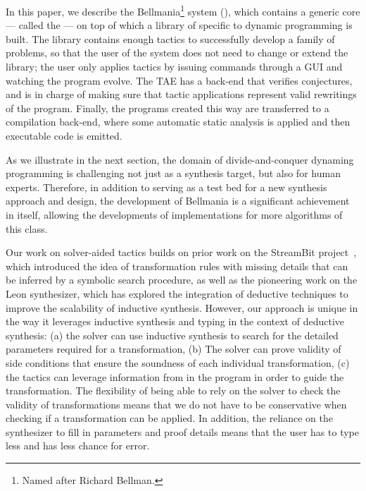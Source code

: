 In this paper, we describe the Bellmania\footnote{Named after Richard Bellman.} system (), which contains a generic
core --- called the  ---
on top of which a library of  specific to dynamic programming
is built. The library contains enough tactics to successfully develop a
family of problems, so that the user of the system does not need to change
or extend the library; the user only applies tactics by issuing commands
through a GUI and watching the program evolve. The TAE has a back-end that
verifies conjectures, and is in charge of making sure that
tactic applications represent valid rewritings of the program. Finally, the
programs created this way are transferred to a compilation back-end, where
some automatic static analysis is applied and then executable code is
emitted.

As we illustrate in the next section, the domain of divide-and-conquer dynaming programming is challenging not just as a synthesis target, but also for human experts. Therefore, in addition to serving as a test bed for a new synthesis approach and design, the development of Bellmania is a significant achievement in itself,
allowing the developments of implementations for more algorithms of this class.

Our work on solver-aided tactics builds on prior work on the StreamBit project~\cite{PLDI05/Solar-Lezama}, which
introduced the idea of transformation rules with missing details that can be inferred by a symbolic search procedure, as
well as the pioneering work on the Leon synthesizer, which has explored the integration of deductive techniques to improve the
scalability of inductive synthesis. However, our approach is unique in the way it leverages inductive synthesis and
typing in the context of deductive synthesis: 
(a) the solver can use inductive synthesis to search for the detailed parameters required for a transformation,
(b) The solver can prove validity of side conditions that ensure the soundness of each individual transformation, 
(c) the tactics can leverage information from  in the program in
    order to guide the transformation. 
The flexibility of being able to rely on the solver to check the validity of transformations means that we do not have to be conservative when checking if a transformation can be applied.
In addition, the reliance on the synthesizer to fill in parameters and proof details means that the user has to type less and has less chance for error.

